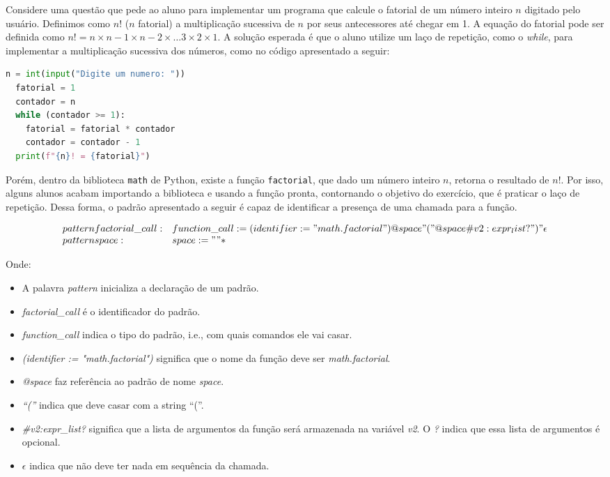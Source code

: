 \documentclass[12pt]{article}
\begin{document}
Considere uma questão que pede ao aluno para implementar um programa que calcule
o fatorial de um número inteiro \(n\) digitado pelo usuário. Definimos como 
\(n!\) (\(n\) fatorial) a multiplicação sucessiva de \(n\) por seus antecessores 
até chegar em 1. 
A equação do fatorial pode ser definida como \(n! = n \times n-1 \times n-2 
\times \ldots 3 \times 2 \times 1\). A solução esperada é que o aluno utilize
um laço de repetição, como o \textit{while}, para implementar a multiplicação
sucessiva dos números, como no código apresentado a seguir:

\begin{lstlisting}[language=Python]
  n = int(input("Digite um numero: "))
  fatorial = 1
  contador = n
  while (contador >= 1):
    fatorial = fatorial * contador
    contador = contador - 1
  print(f"{n}! = {fatorial}")
\end{lstlisting}

Porém, dentro da biblioteca \texttt{math} de Python, existe a função 
\texttt{factorial}, que dado um número inteiro \(n\), retorna o resultado de \(n!\).
Por isso, alguns alunos acabam importando a biblioteca e usando a função pronta,
contornando o objetivo do exercício, que é praticar o laço de repetição.
Dessa forma, o padrão apresentado a seguir é capaz de identificar a presença de
uma chamada para a função.

\[
  \begin{array}{ll}
    pattern factorial\_call : & function\_call := (identifier := "math.factorial") @space "(" @space \#v2:expr_list? ")" \epsilon \\
    pattern space : & space := " "*
    
  \end{array}
\]

Onde:
\begin{itemize}
  \item A palavra \textit{pattern} inicializa a declaração de um padrão.
  \item \textit{factorial\_call} é o identificador do padrão.
  \item \textit{function\_call} indica o tipo do padrão, i.e., com quais comandos 
    ele vai casar.
  \item \textit{(identifier := "math.factorial")} significa que o nome da função 
    deve ser \textit{math.factorial}.
  \item \textit{@space} faz referência ao padrão de nome \textit{space}.
  \item \textit{``(''} indica que deve casar com a string ``(''.
  \item \textit{\#v2:expr\_list?} significa que a lista de argumentos da função
    será armazenada na variável \textit{v2}. O \textit{?} indica que essa lista
    de argumentos é opcional.
  \item \textit{\(\epsilon\)} indica que não deve ter nada em sequência da chamada.
\end{itemize}
\end{document}
